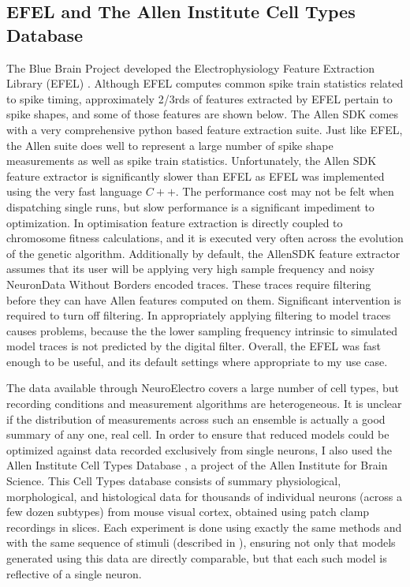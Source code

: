 \subsection{EFEL and The Allen Institute Cell Types Database}
The Blue Brain Project developed the Electrophysiology Feature Extraction Library (EFEL) \citep{EFEL}. Although EFEL computes common spike train statistics related to spike timing, approximately 2/3rds of features extracted by EFEL pertain to spike shapes, and some of those features are shown below. The Allen SDK comes with a very comprehensive python based feature extraction suite. Just like EFEL, the Allen suite does well to represent a large number of spike shape measurements as well as spike train statistics. Unfortunately, the Allen SDK feature extractor is significantly slower than EFEL as EFEL was implemented using the very fast language $C++$. The performance cost may not be felt when dispatching single runs, but slow performance is a significant impediment to optimization. In optimisation feature extraction is directly coupled to chromosome fitness calculations, and it is executed very often across the evolution of the genetic algorithm. Additionally by default, the AllenSDK feature extractor assumes that its user will be applying very high sample frequency and noisy NeuronData Without Borders \citep{teeters2015neurodata} encoded traces. These traces require filtering before they can have Allen features computed on them. Significant intervention is required to turn off filtering. In appropriately applying filtering to model traces causes problems, because the the lower sampling frequency intrinsic to simulated model traces is not predicted by the digital filter. Overall, the EFEL was fast enough to be useful, and its default settings where appropriate to my use case. 
\cite{garcia2014neo}


The data available through NeuroElectro covers a large number of cell types, but recording conditions and measurement algorithms are heterogeneous.
It is unclear if the distribution of measurements across such an ensemble is actually a good summary of any one, real cell.
In order to ensure that reduced models could be optimized against data recorded exclusively from single neurons, I also used the Allen Institute Cell Types Database \citep{celltypes}, a project of the Allen Institute for Brain Science.
This Cell Types database consists of summary physiological, morphological, and histological data for thousands of individual neurons (across a few dozen subtypes) from mouse visual cortex, obtained using patch clamp recordings in slices.
Each experiment is done using exactly the same methods and with the same sequence of stimuli (described in \cite{celltypes}), ensuring not only that models generated using this data are directly comparable, but that each such model is reflective of a single neuron.

